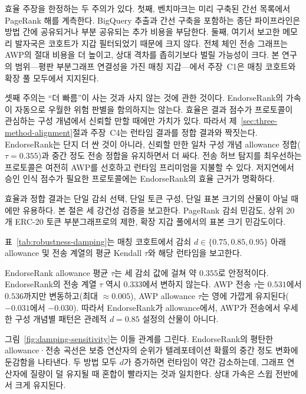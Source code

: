 효율 주장을 한정하는 두 주의가 있다. 첫째, 벤치마크는 미리 구축된 간선 목록에서 PageRank 해를 계측한다. BigQuery 추출과 간선 구축을 포함하는 종단 파이프라인은 방법 간에 공유되거나 부분 공유되는 추가 비용을 부담한다. 둘째, 여기서 보고한 메모리 발자국은 코호트가 지갑 필터되었기 때문에 크지 않다. 전체 체인 전송 그래프는 AWP의 절대 비용을 더 높이고, 상대 격차를 좁히기보다 벌릴 가능성이 크다. 본 연구의 범위---평판 부분그래프 연결성을 가진 매칭 지갑---에서 주장~C1은 매칭 코호트와 확장 풀 모두에서 지지된다.

셋째 주의는 ``더 빠름''이 사는 것과 사지 않는 것에 관한 것이다. EndorseRank의 가속이 자동으로 우월한 위험 판별을 함의하지는 않는다. 효율은 결과 점수가 프로토콜이 관심하는 구성 개념에서 신뢰할 만할 때에만 가치가 있다. 따라서 제~\ref{sec:three-method-alignment}절과 주장~C4는 런타임 결과를 정합 결과와 짝짓는다. EndorseRank는 단지 더 싼 것이 아니라, 신뢰할 만한 일차 구성 개념 allowance 정합($\tau=0.355$)과 중간 정도 전송 정합을 유지하면서 더 싸다. 전송 허브 탐지를 최우선하는 프로토콜은 여전히 AWP를 선호하고 런타임 프리미엄을 지불할 수 있다. 저지연에서 승인 인식 점수가 필요한 프로토콜에는 EndorseRank의 효율 근거가 명확하다.


효율과 정합 결과는 단일 감쇠 선택, 단일 토큰 구성, 단일 표본 크기의 산물이 아닐 때에만 유용하다. 본 절은 세 강건성 검증을 보고한다. PageRank 감쇠 민감도, 상위 20개 ERC-20 토큰 부분그래프로의 제한, 확장 지갑 풀에서의 표본 크기 민감도이다.


표~\ref{tab:robustness-damping}는 매칭 코호트에서 감쇠 $d \in \{0.75, 0.85, 0.95\}$ 아래 allowance 및 전송 계열의 평균 Kendall $\tau$와 해당 런타임을 보고한다.



EndorseRank allowance 평균 $\tau$는 세 감쇠 값에 걸쳐 약 $0.355$로 안정적이다. EndorseRank의 전송 계열 $\tau$ 역시 $0.333$에서 변하지 않는다. AWP 전송 $\tau$는 $0.531$에서 $0.536$까지만 변동하고(최대 $\approx 0.005$), AWP allowance $\tau$는 영에 가깝게 유지된다($-0.031$에서 $-0.030$). 따라서 EndorseRank가 allowance에서, AWP가 전송에서 우세한 구성 개념별 패턴은 관례적 $d=0.85$ 설정의 산물이 아니다.

그림~\ref{fig:damping-sensitivity}는 이들 관계를 그린다. EndorseRank의 평탄한 allowance·전송 곡선은 보증 연산자의 순위가 텔레포테이션 확률의 중간 정도 변화에 둔감함을 나타낸다. 두 방법 모두 $d$가 증가하면 런타임이 약간 감소하는데, 그래프 연산자에 질량이 덜 유지될 때 혼합이 빨라지는 것과 일치한다. 상대 가속은 스윕 전반에서 크게 유지된다.


